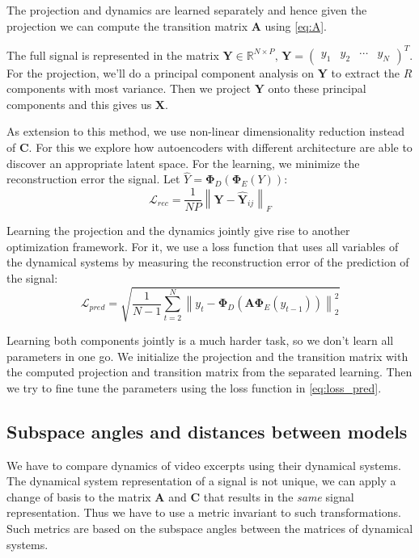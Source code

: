 \documentclass[twocolumn,10pt]{asme2ej}
\newcommand{\norm}[1]{\left\lVert#1\right\rVert}
\begin{document}
The projection and dynamics are learned separately and hence given the projection we can compute the transition matrix $\bm A$ using \eqref{eq:A}.

The full signal is represented in the matrix $\bm Y \in \mathbb{R}^{N \times P},\, \bm Y=\begin{pmatrix}y_1 & y_2 & \cdots & y_{N}\end{pmatrix}^T$. For the projection, we'll do a principal component analysis on $\bm Y$ to extract the $R$ components with most variance. Then we project $\bm Y$ onto these principal components and this gives us $\bm X$.

As extension to this method, we use non-linear dimensionality reduction instead of $\bm C$. For this we explore how autoencoders with different architecture are able to discover an appropriate latent space. For the learning, we minimize the reconstruction error the signal. Let $\widehat{Y} = \bm \Phi_D(\bm \Phi_E(Y))$:
\begin{equation}
    \label{eq:loss_rec}
    \mathcal{L}_{rec} = \frac{1}{NP} \norm{\bm Y - \widehat{\bm Y}_{ij}}_F
\end{equation}

Learning the projection and the dynamics jointly give rise to another optimization framework. For it, we use a loss function that uses all variables of the dynamical systems by measuring the reconstruction error of the prediction of the signal:
\begin{equation}
    \label{eq:loss_pred}
    \mathcal{L}_{pred} = \sqrt{\frac{1}{N-1} \sum_{t=2}^{N} \norm{y_t - \bm \Phi_D(\bm A\bm \Phi_E(y_{t-1}))}_2^2}
\end{equation}

Learning both components jointly is a much harder task, so we don't learn all parameters in one go. We initialize the projection and the transition matrix with the computed projection and transition matrix from the separated learning. Then we try to fine tune the parameters using the loss function in \eqref{eq:loss_pred}.

\subsection{Subspace angles and distances between models}
\label{section:subspace-distances}
We have to compare dynamics of video excerpts using their dynamical systems. The dynamical system representation of a signal is not unique, we can apply a change of basis to the matrix $\bm A$ and $\bm C$ that results in the \textit{same} signal representation. Thus we have to use a metric invariant to such transformations. Such metrics are based on the subspace angles between the matrices of dynamical systems.
\end{document}
